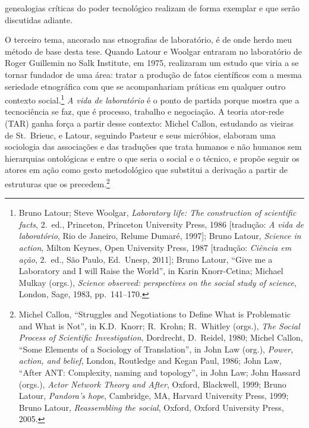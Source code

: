 genealogias críticas do poder tecnológico realizam de forma exemplar e que serão discutidas adiante.

O terceiro tema, ancorado nas etnografias de laboratório, é de onde herdo meu método de base desta tese. Quando Latour e Woolgar entraram no laboratório de Roger Guillemin no Salk Institute, em 1975, realizaram um estudo que viria a se tornar fundador de uma área: tratar a produção de fatos científicos com a mesma seriedade etnográfica com que se acompanhariam práticas em qualquer outro contexto social.\footnote{Bruno Latour; Steve Woolgar, \textit{Laboratory life: The construction of scientific facts}, 2.~ed., Princeton, Princeton University Press, 1986 [tradução: \textit{A vida de laboratório}, Rio de Janeiro, Relume Dumaré, 1997]; Bruno Latour, \textit{Science in action}, Milton Keynes, Open University Press, 1987 [tradução: \textit{Ciência em ação}, 2.~ed., São Paulo, Ed.~Unesp, 2011]; Bruno Latour, \enquote{Give me a Laboratory and I will Raise the World}, in Karin Knorr-Cetina; Michael Mulkay (orgs.), \textit{Science observed: perspectives on the social study of science}, London, Sage, 1983, pp.~141--170.} \textit{A vida de laboratório} é o ponto de partida porque mostra que a tecnociência se faz, que é processo, trabalho e negociação. A teoria ator-rede (TAR) ganha força a partir desse contexto: Michel Callon, estudando as vieiras de St.~Brieuc, e Latour, seguindo Pasteur e seus micróbios, elaboram uma sociologia das associações e das traduções que trata humanos e não humanos sem hierarquias ontológicas e entre o que seria o social e o técnico, e propõe seguir os atores em ação como gesto metodológico que substitui a derivação a partir de estruturas que os precedem.\footnote{Michel Callon, \enquote{Struggles and Negotiations to Define What is Problematic and What is Not}, in K.D.~Knorr; R.~Krohn; R.~Whitley (orgs.), \textit{The Social Process of Scientific Investigation}, Dordrecht, D.~Reidel, 1980; Michel Callon, \enquote{Some Elements of a Sociology of Translation}, in John Law (org.), \textit{Power, action, and belief}, London, Routledge and Kegan Paul, 1986; John Law, \enquote{After ANT: Complexity, naming and topology}, in John Law; John Hassard (orgs.), \textit{Actor Network Theory and After}, Oxford, Blackwell, 1999; Bruno Latour, \textit{Pandora's hope}, Cambridge, MA, Harvard University Press, 1999; Bruno Latour, \textit{Reassembling the social}, Oxford, Oxford University Press, 2005.}

